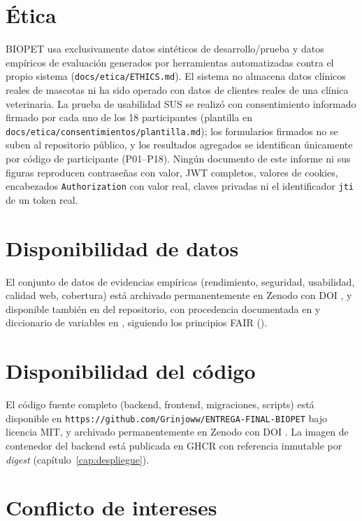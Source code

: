 \section{\'Etica}

BIOPET usa exclusivamente datos sint\'eticos de desarrollo/prueba y datos
emp\'iricos de evaluaci\'on generados por herramientas automatizadas
contra el propio sistema (\texttt{docs/etica/ETHICS.md}). El sistema no
almacena datos cl\'inicos reales de mascotas ni ha sido operado con datos
de clientes reales de una cl\'inica veterinaria. La prueba de usabilidad
SUS se realiz\'o con consentimiento informado firmado por cada uno de los
18 participantes (plantilla en \texttt{docs/etica/consentimientos/plantilla.md});
los formularios firmados no se suben al repositorio p\'ublico, y los
resultados agregados se identifican \'unicamente por c\'odigo de
participante (P01--P18). Ning\'un documento de este informe ni sus figuras
reproducen contrase\~nas con valor, JWT completos, valores de cookies,
encabezados \texttt{Authorization} con valor real, claves privadas ni el
identificador \texttt{jti} de un token real.

\section{Disponibilidad de datos}

El conjunto de datos de evidencias emp\'iricas (rendimiento, seguridad,
usabilidad, calidad web, cobertura) est\'a archivado permanentemente en
Zenodo con DOI \texttt{\doidataset}, y disponible tambi\'en en
 del repositorio, con procedencia documentada en
 y diccionario de variables en
, siguiendo los principios
FAIR ().

\section{Disponibilidad del c\'odigo}

El c\'odigo fuente completo (backend, frontend, migraciones, scripts) est\'a
disponible en \texttt{https://github.com/Grinjoww/ENTREGA-FINAL-BIOPET}
bajo licencia MIT, y archivado permanentemente en Zenodo con DOI
\texttt{\doisoftware}. La imagen de contenedor del backend est\'a publicada
en GHCR con referencia inmutable por \emph{digest}
(cap\'itulo~\ref{cap:despliegue}).

\section{Conflicto de intereses}

